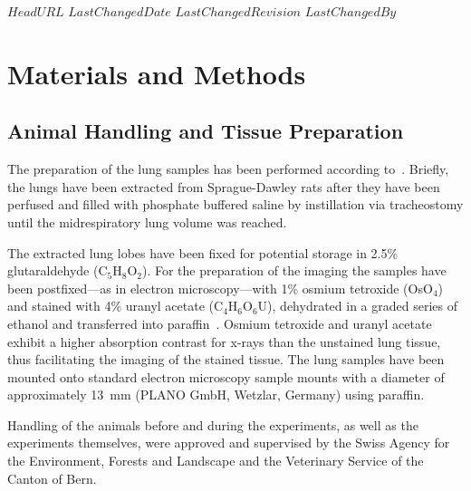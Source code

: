 \svnidlong
{$HeadURL$}
{$LastChangedDate$}
{$LastChangedRevision$}
{$LastChangedBy$}

\begin{center}
\end{center}

\section{Materials and Methods}
\label{sec:materials and methods}
\subsection{Animal Handling and Tissue Preparation}
The preparation of the lung samples has been performed according to~\citet{Schittny1997,Schittny1998}. Briefly, the lungs have been extracted from Sprague-Dawley rats after they have been perfused and filled with phosphate buffered saline by instillation via tracheostomy until the midrespiratory lung volume was reached.

The extracted lung lobes have been fixed for potential storage in 2.5\% glutaraldehyde (C$_5$H$_8$O$_2$). For the preparation of the imaging the samples have been postfixed---as in electron microscopy---with 1\% osmium tetroxide (OsO$_4$) and stained with 4\% uranyl acetate (C$_4$H$_6$O$_6$U), dehydrated in a graded series of ethanol and transferred into paraffin~\cite{Schittny1998,Schittny1997}. Osmium tetroxide and uranyl acetate exhibit a higher absorption contrast for x-rays than the unstained lung tissue, thus facilitating the imaging of the stained tissue. The lung samples have been mounted onto standard electron microscopy sample mounts with a diameter of approximately \SI{13}{\milli\meter} (PLANO GmbH, Wetzlar, Germany) using paraffin.

Handling of the animals before and during the experiments, as well as the experiments themselves, were approved and supervised by the Swiss Agency for the Environment, Forests and Landscape and the Veterinary Service of the Canton of Bern.

